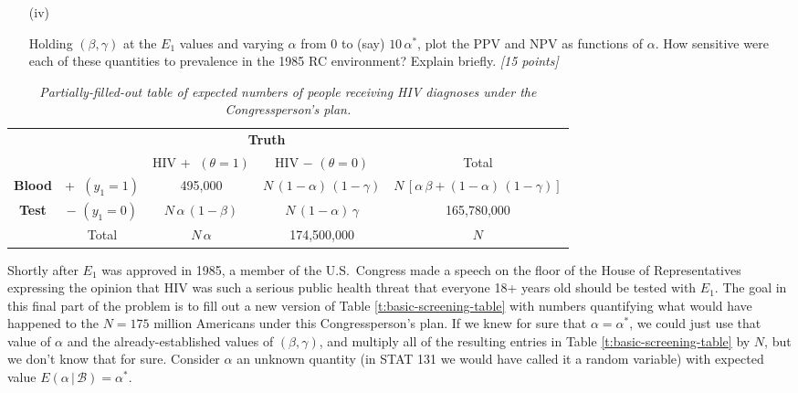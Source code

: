 \documentclass[12pt]{article}
\newcommand{\given}{\, | \,}
\begin{document}
\begin{itemize}
\begin{itemize}
\item[(iv)]

Holding $( \beta, \gamma )$ at the $E_1$ values and varying $\alpha$ from 0 to (say) $10 \, \alpha^*$, plot the PPV and NPV as functions of $\alpha$. How sensitive were each of these quantities to prevalence in the 1985 RC environment? Explain briefly. \textit{[15 points]}

\end{itemize}

\begin{table}[t!]

\centering

\caption{\textit{Partially-filled-out table of expected numbers of people receiving HIV diagnoses under the Congressperson's plan.}}

\label{t:congressperson-table}

\bigskip

\begin{tabular}{cc|c|c|c}

& \multicolumn{1}{c}{} & \multicolumn{2}{c}{\textbf{Truth}} \\

& \multicolumn{1}{c}{} & \multicolumn{1}{c}{HIV \textcircled{+} $( \theta = 1 )$} & \multicolumn{1}{c}{HIV \textcircled{$-$} $( \theta = 0 )$}  & Total \\ \cline{3-4}

\textbf{Blood} & \textcircled{+} $( y_1 = 1 )$ & 495,000 & $N \, ( 1 - \alpha ) \, ( 1 - \gamma )$ & $N \, [ \alpha \, \beta + ( 1 - \alpha ) \, ( 1 - \gamma ) ]$ \\ \cline{3-4}

\textbf{Test} & \textcircled{$-$} $( y_1 = 0 )$ & $N \, \alpha \, ( 1 - \beta )$ & $N \, ( 1 - \alpha ) \, \gamma$ & 165,780,000 \\ \cline{3-4}

& \multicolumn{1}{c}{Total} & \multicolumn{1}{c}{$N \, \alpha$} & \multicolumn{1}{c}{174,500,000} & $N$

\end{tabular}

\end{table}

Shortly after $E_1$ was approved in 1985, a member of the U.S.~Congress made a speech on the floor of the House of Representatives expressing the opinion that HIV was such a serious public health threat that everyone 18+ years old should be tested with $E_1$. The goal in this final part of the problem is to fill out a new version of Table \ref{t:basic-screening-table} with numbers quantifying what would have happened to the $N = 175$ million Americans under this Congressperson's plan. If we knew for sure that $\alpha = \alpha^*$, we could just use that value of $\alpha$ and the already-established values of $( \beta, \gamma )$, and multiply all of the resulting entries in Table \ref{t:basic-screening-table} by $N$, but we don't know that for sure. Consider $\alpha$ an unknown quantity (in STAT 131 we would have called it a random variable) with expected value $E ( \alpha \given \mathcal{ B } ) = \alpha^*$. 


\end{itemize}
\end{document}
